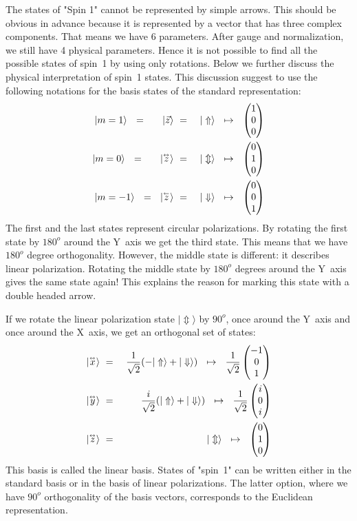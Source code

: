 \documentclass[onecolumn,fleqn]{revtex4}
\newcommand{\vecb}[1]{\overset{{}_{\leftarrow}}{#1}}
\newcommand{\vecm}[1]{\overset{{}_{\leftrightarrow}}{#1}}
\newcommand{\amatrix}[1]{\begin{matrix} #1 \end{matrix}}
\newcommand{\beq}{\begin{eqnarray}}
\newcommand{\eeq}{\end{eqnarray}}
\begin{document}
The states of "Spin 1" cannot be represented 
by simple arrows. This should be obvious  
in advance because it is represented by 
a vector that has three complex components. 
That means we have 6 parameters. 
After gauge and normalization, we still have 4 physical parameters.  
Hence it is not possible to find all the possible 
states of spin~1 by using only rotations.
Below we further discuss the physical 
interpretation of spin~1 states. This discussion 
suggest to use the following notations  
for the basis states of the standard representation:   
\beq
|m=1 \rangle 
\ \ = \ \  
\ \ \ | \vec{z} \rangle 
& \ = \ &   | \Uparrow \rangle 
\ \  \mapsto \ \  
\left(\amatrix{1 \cr 0 \cr 0 }\right) 
\\ 
|m=0 \rangle 
\ \ = \ \
\ \ \ | \vecm{z} \rangle 
& \ = \ & | \Updownarrow \rangle 
\ \  \mapsto \ \ 
\left(\amatrix{0 \cr 1 \cr 0 }\right) 
\\ 
|m=-1 \rangle 
\ \ = \ \
|\vecb{z} \rangle 
& \ = \ & | \Downarrow \rangle 
\ \  \mapsto \ \ 
\left(\amatrix{0 \cr 0 \cr 1 }\right) 
\eeq
The first and the last states represent circular polarizations. 
By rotating the first state by ${180^o}$ around the Y~axis 
we get the third state. This means that we have $180^o$ degree 
orthogonality. However, the middle state is different:  
it describes linear polarization. Rotating the middle 
state by $180^o$ degrees around the Y~axis
gives the same state again! This explains the reason 
for marking this state with a double headed arrow.  
  
If we rotate the linear polarization 
state ${|\Updownarrow \rangle}$ by ${90^o}$, 
once around the Y~axis and once around the X~axis,  
we get an orthogonal set of states:
\beq
| \vecm{x} \rangle 
& \ = \ & \frac{1}{\sqrt{2}}(-| \Uparrow \rangle + | \Downarrow \rangle ) 
\ \  \mapsto \ \  
\frac{1}{\sqrt{2}} \left(\amatrix{-1 \cr 0 \cr 1 }\right)
\\ 
| \vecm{y} \rangle 
& \ = \ & \frac{i}{\sqrt{2}}(| \Uparrow \rangle + | \Downarrow \rangle ) 
\ \  \mapsto \ \  
\frac{1}{\sqrt{2}} \left(\amatrix{i \cr 0 \cr i }\right)
\\ 
| \vecm{z} \rangle 
& \ = \ & | \Updownarrow \rangle 
\ \  \mapsto \ \  
\left(\amatrix{0 \cr 1 \cr 0 }\right) 
\eeq
This basis is called the linear basis. States 
of "spin~1" can be written either in the standard basis
or in the basis of linear polarizations. The latter   
option, where we have $90^o$ orthogonality of 
the basis vectors, corresponds to the Euclidean representation. 
 
\end{document}

